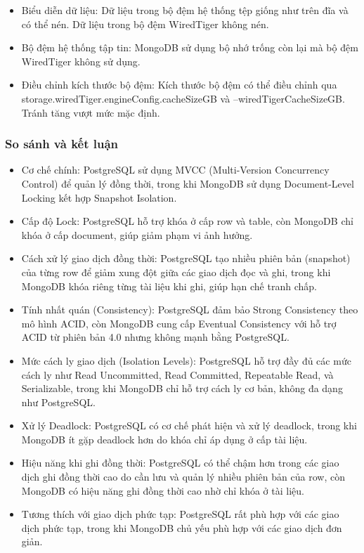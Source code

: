 \begin{enumerate}
\begin{itemize}
        \item Biểu diễn dữ liệu: Dữ liệu trong bộ đệm hệ thống tệp giống như trên đĩa và có thể nén. Dữ liệu trong bộ đệm WiredTiger không nén.
        \item Bộ đệm hệ thống tập tin: MongoDB sử dụng bộ nhớ trống còn lại mà bộ đệm WiredTiger không sử dụng.
        \item Điều chỉnh kích thước bộ đệm: Kích thước bộ đệm có thể điều chỉnh qua storage.wiredTiger.engineConfig.cacheSizeGB và --wiredTigerCacheSizeGB. Tránh tăng vượt mức mặc định.
    \end{itemize}
\end{enumerate}
\subsubsection{So sánh và kết luận}
\begin{itemize}
    \item Cơ chế chính: PostgreSQL sử dụng MVCC (Multi-Version Concurrency Control) để quản lý đồng thời, trong khi MongoDB sử dụng Document-Level Locking kết hợp Snapshot Isolation.
    \item Cấp độ Lock: PostgreSQL hỗ trợ khóa ở cấp row và table, còn MongoDB chỉ khóa ở cấp document, giúp giảm phạm vi ảnh hưởng.
    \item Cách xử lý giao dịch đồng thời: PostgreSQL tạo nhiều phiên bản (snapshot) của từng row để giảm xung đột giữa các giao dịch đọc và ghi, trong khi MongoDB khóa riêng từng tài liệu khi ghi, giúp hạn chế tranh chấp.
    \item Tính nhất quán (Consistency): PostgreSQL đảm bảo Strong Consistency theo mô hình ACID, còn MongoDB cung cấp Eventual Consistency với hỗ trợ ACID từ phiên bản 4.0 nhưng không mạnh bằng PostgreSQL.
    \item Mức cách ly giao dịch (Isolation Levels): PostgreSQL hỗ trợ đầy đủ các mức cách ly như Read Uncommitted, Read Committed, Repeatable Read, và Serializable, trong khi MongoDB chỉ hỗ trợ cách ly cơ bản, không đa dạng như PostgreSQL.
    \item Xử lý Deadlock: PostgreSQL có cơ chế phát hiện và xử lý deadlock, trong khi MongoDB ít gặp deadlock hơn do khóa chỉ áp dụng ở cấp tài liệu.
    \item Hiệu năng khi ghi đồng thời: PostgreSQL có thể chậm hơn trong các giao dịch ghi đồng thời cao do cần lưu và quản lý nhiều phiên bản của row, còn MongoDB có hiệu năng ghi đồng thời cao nhờ chỉ khóa ở tài liệu.
    \item Tương thích với giao dịch phức tạp: PostgreSQL rất phù hợp với các giao dịch phức tạp, trong khi MongoDB chủ yếu phù hợp với các giao dịch đơn giản.
\end{itemize}
